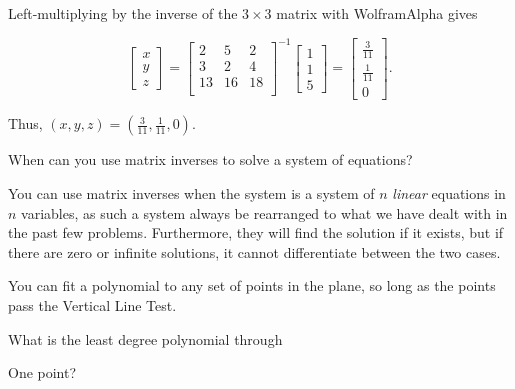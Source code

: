 \documentclass[../key.tex]{subfiles}
\begin{document}
Left-multiplying by the inverse of the $3\times 3$ matrix with WolframAlpha gives

$$\begin{bmatrix}
x \\ y \\ z \end{bmatrix} = \begin{bmatrix}
2 & 5 & 2 \\
3 & 2 & 4 \\
13 & 16 & 18 \\
\end{bmatrix}^{-1}\begin{bmatrix} 1 \\ 1 \\ 5 \end{bmatrix} = \begin{bmatrix} \frac{3}{11} \\ \frac{1}{11} \\ 0 \end{bmatrix}.$$

Thus, $(x,y,z)=\left(\frac{3}{11},\frac{1}{11},0\right)$.

\begin{inner_problem}
\item When can you use matrix inverses to solve a system of equations?
\end{inner_problem}

You can use matrix inverses when the system is a system of $n$ \textit{linear} equations in $n$ variables, as such a system always be rearranged to what we have dealt with in the past few problems. Furthermore, they will find the solution if it exists, but if there are zero or infinite solutions, it cannot differentiate between the two cases.

\begin{outer_problem}
\item You can fit a polynomial to any set of points in the plane, so long as the points pass the Vertical Line Test.
\end{outer_problem}

\begin{inner_problem}[start=1]
\item What is the least degree polynomial through
\end{inner_problem}

\begin{iinner_problem}[start=1]
\item One point?
\end{iinner_problem}
\end{document}
